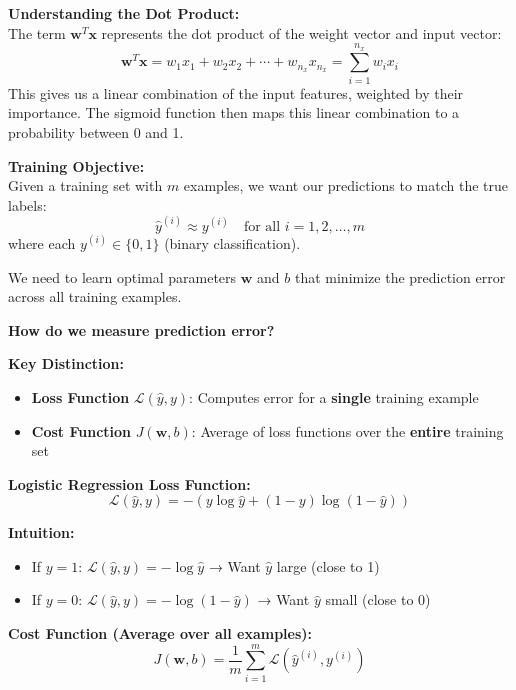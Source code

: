 \documentclass[11pt,a4paper]{article}
\theoremstyle{definition}
\theoremstyle{remark}
\newcommand{\vect}[1]{\bm{#1}}
\begin{document}
\vspace{0.4cm}

\begin{intuition}
\textbf{Understanding the Dot Product:} \\
The term $\vect{w}^T \vect{x}$ represents the dot product of the weight vector and input vector:
\[
\vect{w}^T \vect{x} = w_1 x_1 + w_2 x_2 + \cdots + w_{n_x} x_{n_x} = \sum_{i=1}^{n_x} w_i x_i
\]
This gives us a linear combination of the input features, weighted by their importance. The sigmoid function then maps this linear combination to a probability between 0 and 1.
\end{intuition}

\vspace{0.4cm}

\begin{keyconcept}
\textbf{Training Objective:} \\
Given a training set with $m$ examples, we want our predictions to match the true labels:
\[
\hat{y}^{(i)} \approx y^{(i)} \quad \text{for all } i = 1, 2, \ldots, m
\]
where each $y^{(i)} \in \{0, 1\}$ (binary classification).

We need to learn optimal parameters $\vect{w}$ and $b$ that minimize the prediction error across all training examples.
\end{keyconcept}

\vspace{0.4cm}

\begin{followup}
\textbf{How do we measure prediction error?}

\textbf{Key Distinction:}
\begin{itemize}
    \item \textbf{Loss Function} $\mathcal{L}(\hat{y}, y)$: Computes error for a \textbf{single} training example
    \item \textbf{Cost Function} $J(\vect{w}, b)$: Average of loss functions over the \textbf{entire} training set
\end{itemize}

\textbf{Logistic Regression Loss Function:}
\[
\mathcal{L}(\hat{y}, y) = -(y \log \hat{y} + (1-y) \log(1-\hat{y}))
\]

\textbf{Intuition:}
\begin{itemize}
    \item If $y = 1$: $\mathcal{L}(\hat{y}, y) = -\log \hat{y}$ → Want $\hat{y}$ large (close to 1)
    \item If $y = 0$: $\mathcal{L}(\hat{y}, y) = -\log(1-\hat{y})$ → Want $\hat{y}$ small (close to 0)
\end{itemize}

\textbf{Cost Function (Average over all examples):}
\[
J(\vect{w}, b) = \frac{1}{m} \sum_{i=1}^{m} \mathcal{L}(\hat{y}^{(i)}, y^{(i)})
\]
\end{followup}
\end{document}
